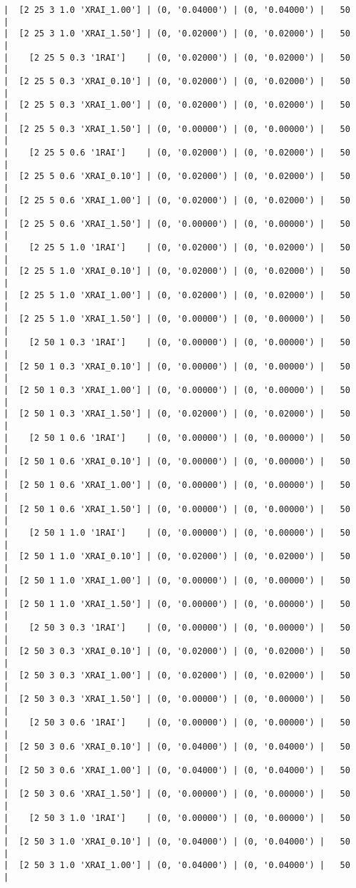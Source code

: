 \documentclass{article}
\begin{document}
\begin{verbatim}
|  [2 25 3 1.0 'XRAI_1.00'] | (0, '0.04000') | (0, '0.04000') |   50  |
|  [2 25 3 1.0 'XRAI_1.50'] | (0, '0.02000') | (0, '0.02000') |   50  |
|    [2 25 5 0.3 '1RAI']    | (0, '0.02000') | (0, '0.02000') |   50  |
|  [2 25 5 0.3 'XRAI_0.10'] | (0, '0.02000') | (0, '0.02000') |   50  |
|  [2 25 5 0.3 'XRAI_1.00'] | (0, '0.02000') | (0, '0.02000') |   50  |
|  [2 25 5 0.3 'XRAI_1.50'] | (0, '0.00000') | (0, '0.00000') |   50  |
|    [2 25 5 0.6 '1RAI']    | (0, '0.02000') | (0, '0.02000') |   50  |
|  [2 25 5 0.6 'XRAI_0.10'] | (0, '0.02000') | (0, '0.02000') |   50  |
|  [2 25 5 0.6 'XRAI_1.00'] | (0, '0.02000') | (0, '0.02000') |   50  |
|  [2 25 5 0.6 'XRAI_1.50'] | (0, '0.00000') | (0, '0.00000') |   50  |
|    [2 25 5 1.0 '1RAI']    | (0, '0.02000') | (0, '0.02000') |   50  |
|  [2 25 5 1.0 'XRAI_0.10'] | (0, '0.02000') | (0, '0.02000') |   50  |
|  [2 25 5 1.0 'XRAI_1.00'] | (0, '0.02000') | (0, '0.02000') |   50  |
|  [2 25 5 1.0 'XRAI_1.50'] | (0, '0.00000') | (0, '0.00000') |   50  |
|    [2 50 1 0.3 '1RAI']    | (0, '0.00000') | (0, '0.00000') |   50  |
|  [2 50 1 0.3 'XRAI_0.10'] | (0, '0.00000') | (0, '0.00000') |   50  |
|  [2 50 1 0.3 'XRAI_1.00'] | (0, '0.00000') | (0, '0.00000') |   50  |
|  [2 50 1 0.3 'XRAI_1.50'] | (0, '0.02000') | (0, '0.02000') |   50  |
|    [2 50 1 0.6 '1RAI']    | (0, '0.00000') | (0, '0.00000') |   50  |
|  [2 50 1 0.6 'XRAI_0.10'] | (0, '0.00000') | (0, '0.00000') |   50  |
|  [2 50 1 0.6 'XRAI_1.00'] | (0, '0.00000') | (0, '0.00000') |   50  |
|  [2 50 1 0.6 'XRAI_1.50'] | (0, '0.00000') | (0, '0.00000') |   50  |
|    [2 50 1 1.0 '1RAI']    | (0, '0.00000') | (0, '0.00000') |   50  |
|  [2 50 1 1.0 'XRAI_0.10'] | (0, '0.02000') | (0, '0.02000') |   50  |
|  [2 50 1 1.0 'XRAI_1.00'] | (0, '0.00000') | (0, '0.00000') |   50  |
|  [2 50 1 1.0 'XRAI_1.50'] | (0, '0.00000') | (0, '0.00000') |   50  |
|    [2 50 3 0.3 '1RAI']    | (0, '0.00000') | (0, '0.00000') |   50  |
|  [2 50 3 0.3 'XRAI_0.10'] | (0, '0.02000') | (0, '0.02000') |   50  |
|  [2 50 3 0.3 'XRAI_1.00'] | (0, '0.02000') | (0, '0.02000') |   50  |
|  [2 50 3 0.3 'XRAI_1.50'] | (0, '0.00000') | (0, '0.00000') |   50  |
|    [2 50 3 0.6 '1RAI']    | (0, '0.00000') | (0, '0.00000') |   50  |
|  [2 50 3 0.6 'XRAI_0.10'] | (0, '0.04000') | (0, '0.04000') |   50  |
|  [2 50 3 0.6 'XRAI_1.00'] | (0, '0.04000') | (0, '0.04000') |   50  |
|  [2 50 3 0.6 'XRAI_1.50'] | (0, '0.00000') | (0, '0.00000') |   50  |
|    [2 50 3 1.0 '1RAI']    | (0, '0.00000') | (0, '0.00000') |   50  |
|  [2 50 3 1.0 'XRAI_0.10'] | (0, '0.04000') | (0, '0.04000') |   50  |
|  [2 50 3 1.0 'XRAI_1.00'] | (0, '0.04000') | (0, '0.04000') |   50  |

\end{verbatim}
\end{document}

